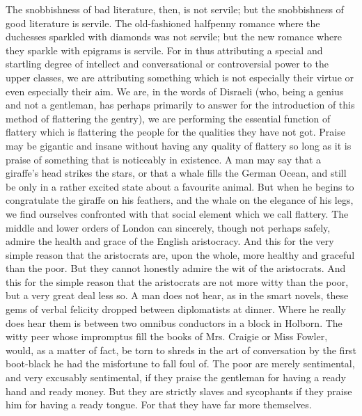 The snobbishness of bad literature, then, is not servile; but the snobbishness of good literature is servile. The old-fashioned halfpenny romance where the duchesses sparkled with diamonds was not servile; but the new romance where they sparkle with epigrams is servile. For in thus attributing a special and startling degree of intellect and conversational or controversial power to the upper classes, we are attributing something which is not especially their virtue or even especially their aim. We are, in the words of Disraeli (who, being a genius and not a gentleman, has perhaps primarily to answer for the introduction of this method of flattering the gentry), we are performing the essential function of flattery which is flattering the people for the qualities they have not got. Praise may be gigantic and insane without having any quality of flattery so long as it is praise of something that is noticeably in existence. A man may say that a giraffe’s head strikes the stars, or that a whale fills the German Ocean, and still be only in a rather excited state about a favourite animal. But when he begins to congratulate the giraffe on his feathers, and the whale on the elegance of his legs, we find ourselves confronted with that social element which we call flattery. The middle and lower orders of London can sincerely, though not perhaps safely, admire the health and grace of the English aristocracy. And this for the very simple reason that the aristocrats are, upon the whole, more healthy and graceful than the poor. But they cannot honestly admire the wit of the aristocrats. And this for the simple reason that the aristocrats are not more witty than the poor, but a very great deal less so. A man does not hear, as in the smart novels, these gems of verbal felicity dropped between diplomatists at dinner. Where he really does hear them is between two omnibus conductors in a block in Holborn. The witty peer whose impromptus fill the books of Mrs. Craigie or Miss Fowler, would, as a matter of fact, be torn to shreds in the art of conversation by the first boot-black he had the misfortune to fall foul of. The poor are merely sentimental, and very excusably sentimental, if they praise the gentleman for having a ready hand and ready money. But they are strictly slaves and sycophants if they praise him for having a ready tongue. For that they have far more themselves.

